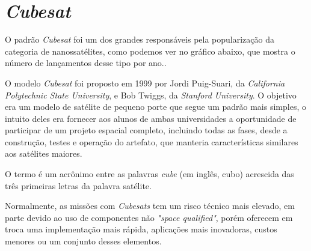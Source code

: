 \section{\textit{Cubesat}}\label{cubesat_specs}

O padrão \textit{Cubesat} foi um dos grandes responsáveis pela popularização da categoria de nanossatélites, como podemos ver no gráfico abaixo, que mostra o número de lançamentos desse tipo por ano.\cite{cubesats_cgee}.

\noindent
\begin{minipage}{\linewidth}
\label{cubesat_launches_fig}
\end{minipage}

O modelo \textit{Cubesat} foi proposto em 1999 por Jordi Puig-Suari, da \textit{California Polytechnic State University}, e Bob Twiggs, da \textit{Stanford University}. O objetivo era um modelo de satélite de pequeno porte que segue um padrão mais simples, o intuito deles era fornecer aos alunos de ambas universidades a oportunidade de  participar de um projeto espacial completo, incluindo todas as fases, desde a construção, testes e operação do artefato, que manteria características similares aos satélites maiores. 

O termo é um acrônimo entre as palavras \textit{cube} (em inglês, cubo) acrescida das três primeiras letras da palavra satélite.

Normalmente, as missões com \textit{Cubesats} tem um risco técnico mais elevado, em parte devido ao uso de componentes não \textit{"space qualified"}, porém oferecem em troca uma implementação mais rápida, aplicações mais inovadoras, custos menores ou um conjunto desses elementos.

